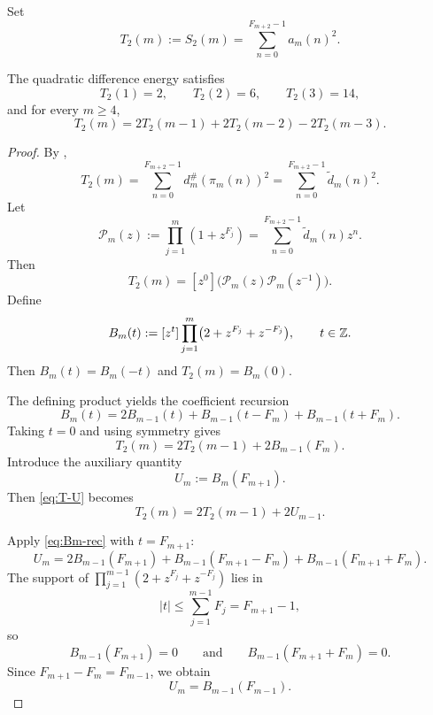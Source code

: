 \begin{definition}
\label{def:T2}
Set
\[
  T_2(m):=S_2(m)=\sum_{n=0}^{F_{m+2}-1} a_m(n)^2.
\]
\end{definition}

\begin{theorem}
\label{thm:cubic-recurrence}
The quadratic difference energy satisfies
\[
  T_2(1)=2,\qquad T_2(2)=6,\qquad T_2(3)=14,
\]
and for every \(m\ge 4\),
\[
  T_2(m)=2T_2(m-1)+2T_2(m-2)-2T_2(m-3).
\]
\end{theorem}

\begin{proof}
By ,
\[
  T_2(m)
  =
  \sum_{n=0}^{F_{m+2}-1}d_m^\#(\pi_m(n))^2
  =
  \sum_{n=0}^{F_{m+2}-1}\widetilde d_m(n)^2.
\]
Let
\[
  \mathcal P_m(z):=\prod_{j=1}^m(1+z^{F_j})
  =
  \sum_{n=0}^{F_{m+2}-1}\widetilde d_m(n)z^n.
\]
Then
\[
  T_2(m)
  =
  [z^0]\bigl(\mathcal P_m(z)\mathcal P_m(z^{-1})\bigr).
\]
Define
\[
  B_m(t):=[z^t]\prod_{j=1}^m\bigl(2+z^{F_j}+z^{-F_j}\bigr),
  \qquad t\in\mathbb{Z}.
\]
Then \(B_m(t)=B_m(-t)\) and \(T_2(m)=B_m(0)\).

The defining product yields the coefficient recursion
\begin{equation}\label{eq:Bm-rec}
  B_m(t)=2B_{m-1}(t)+B_{m-1}(t-F_m)+B_{m-1}(t+F_m).
\end{equation}
Taking \(t=0\) and using symmetry gives
\begin{equation}\label{eq:T-U}
  T_2(m)=2T_2(m-1)+2B_{m-1}(F_m).
\end{equation}
Introduce the auxiliary quantity
\[
  U_m:=B_m(F_{m+1}).
\]
Then \eqref{eq:T-U} becomes
\begin{equation}\label{eq:T-U2}
  T_2(m)=2T_2(m-1)+2U_{m-1}.
\end{equation}

Apply \eqref{eq:Bm-rec} with \(t=F_{m+1}\):
\[
  U_m
  =
  2B_{m-1}(F_{m+1})
  +B_{m-1}(F_{m+1}-F_m)
  +B_{m-1}(F_{m+1}+F_m).
\]
The support of \(\prod_{j=1}^{m-1}(2+z^{F_j}+z^{-F_j})\) lies in
\[
  |t|\le \sum_{j=1}^{m-1}F_j=F_{m+1}-1,
\]
so
\[
  B_{m-1}(F_{m+1})=0
  \qquad\text{and}\qquad
  B_{m-1}(F_{m+1}+F_m)=0.
\]
Since \(F_{m+1}-F_m=F_{m-1}\), we obtain
\begin{equation}\label{eq:U-shift}
  U_m=B_{m-1}(F_{m-1}).
\end{equation}


\end{proof}
